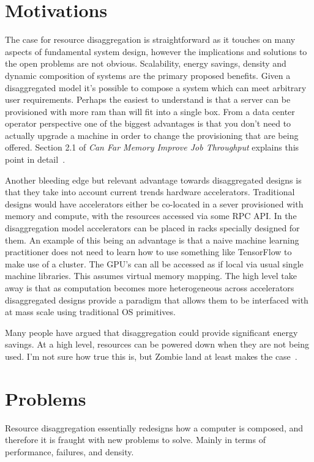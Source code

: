 \section{Motivations}


The case for resource disaggregation is straightforward as it touches on many
aspects of fundamental system design, however the implications and solutions to
the open problems are not obvious. Scalability, energy savings, density and
dynamic composition of systems are the primary proposed benefits. Given a
disaggregated model it’s possible to compose a system which can meet arbitrary
user requirements. Perhaps the easiest to understand is that a server can be
provisioned with more ram than will fit into a single box. From a data center
operator perspective one of the biggest advantages is that you don't need to
actually upgrade a machine in order to change the provisioning that are being
offered. Section 2.1 of \textit{Can Far Memory Improve Job Throughput} explains
this point in detail~\cite{jobthroughput}. 

Another bleeding edge but relevant advantage towards disaggregated designs is
that they take into account current trends hardware accelerators. Traditional
designs would have accelerators either be co-located in a sever provisioned
with memory and compute, with the resources accessed via some RPC API. In the
disaggregation model accelerators can be placed in racks specially designed for
them. An example of this being an advantage is that a naive machine learning
practitioner does not need to learn how to use something like TensorFlow to make
use of a cluster. The GPU's can all be accessed as if local via usual single
machine libraries. This assumes virtual memory mapping. The high level take away
is that as computation becomes more heterogeneous across accelerators
disaggregated designs provide a paradigm that allows them to be interfaced with
at mass scale using traditional OS primitives.

Many people have argued that disaggregation could provide significant energy
savings. At a high level, resources can be powered down when they are not being
used. I'm not sure how true this is, but Zombie land at least makes the
case~\cite{zombieland}.

\section{Problems}

Resource disaggregation essentially redesigns how a computer is composed, and
therefore it is fraught with new problems to solve. Mainly in terms of
performance, failures, and density.

